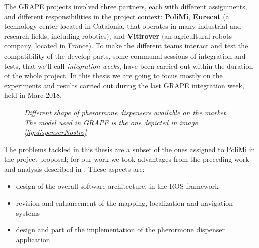 The \ac{GRAPE} projects involved three partners, each with different assignments, and different responsibilities in the project context: \textbf{PoliMi}, \textbf{Eurecat} (a technology center located in Catalonia, that operates in many industrial and research fields, including robotics), and \textbf{Vitirover} (an agricultural robots company, located in France).
To make the different teams interact and test the compatibility of the develop parts, some communal sessions of integration and tests, that we'll call \textit{integration weeks}, have been carried out within the duration of the whole project. In this thesis we are going to focus mostly on the experiments and results carried out during the last \ac{GRAPE} integration week, held in Marc 2018.

\begin{figure}
	\centering
	\qquad
	\qquad
	\caption{\textit{Different shape of pherormone dispensers available on the market. The model used in \ac{GRAPE} is the one depicted in image \ref{fig:dispenserNostro}}}
	\label{fig:dispensers}
\end{figure}

The problems tackled in this thesis are a subset of the ones assigned to PoliMi in the project proposal; for our work we took advantages from the preceding work and analysis described in \cite{grapeAltroPaper}. These aspects are:
\begin{itemize}
	\item design of the overall software architecture, in the \ac{ROS} framework
	\item revision and enhancement of the mapping, localization and navigation systems
	\item design and part of the implementation of the pherormone dispenser application
\end{itemize}

